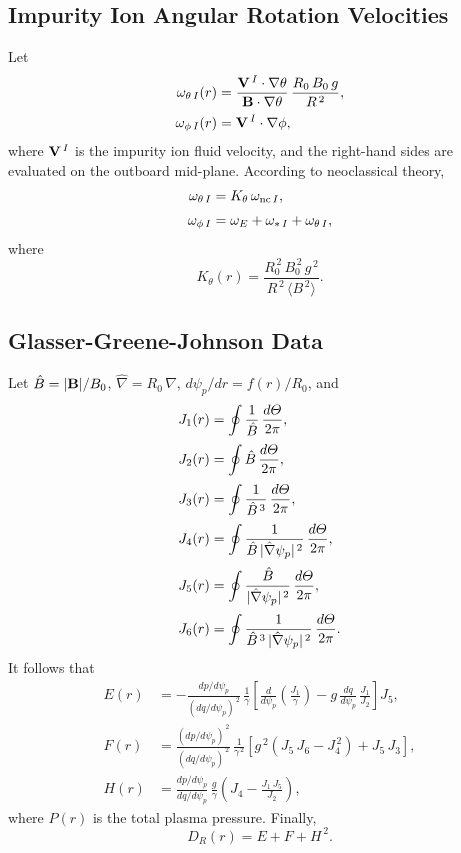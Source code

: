 \documentclass[notitlepage,12pt]{article}
\begin{document}
\subsection{Impurity Ion Angular Rotation Velocities}\label{srotation}
Let
\begin{align}
\omega_{\theta\,I}(r)&=\frac{{\bf V}^{\,I}\cdot\nabla\theta}{{\bf B}\cdot\nabla\theta}\,\frac{R_0\,B_0\,g}{R^{\,2}},\\[0.5ex]
\omega_{\phi\,I}(r) &= {\bf V}^{\,I}\cdot\nabla\phi,
\end{align}
where ${\bf V}^{\,I}$ is the impurity ion fluid velocity, and the right-hand sides are evaluated on the outboard mid-plane. According to neoclassical theory,
\begin{align}
\omega_{\theta\,I} &= K_\theta\,\omega_{{\rm nc}\,I},\\[0.5ex]
\omega_{\phi\,I} &= \omega_E+\omega_{\ast\,I} + \omega_{\theta\,I},
\end{align}
where
\begin{equation}
K_\theta(r) = \frac{R_0^{\,2}\,B_0^{\,2}\,g^{\,2}}{R^{\,2}\,\langle B^{\,2}\rangle}.
\end{equation}

\subsection{Glasser-Greene-Johnson Data}
Let $\hat{B}=|{\bf B}|/B_0$, $\hat{\nabla}= R_0\,\nabla$, $d\psi_p/dr = f(r)/R_0$, and 
\begin{align}
J_1(r) &= \oint\frac{1}{\hat{B}}\,\frac{d{\mit\Theta}}{2\pi},\\[0.5ex]
J_2(r) &= \oint \hat{B}\,\frac{d{\mit\Theta}}{2\pi},\\[0.5ex]
J_3(r) &= \oint\frac{1}{\hat{B}^{\,3}}\,\frac{d{\mit\Theta}}{2\pi},\\[0.5ex]
J_4(r) &= \oint\frac{1}{\hat{B}\,|\hat{\nabla}\psi_p|^{\,2}}\,\frac{d{\mit\Theta}}{2\pi},\\[0.5ex]
J_5(r) &= \oint\frac{\hat{B}}{|\hat{\nabla}\psi_p|^{\,2}}\,\frac{d{\mit\Theta}}{2\pi},\\[0.5ex]
J_6(r) &= \oint\frac{1}{\hat{B}^{\,3}\,|\hat{\nabla}\psi_p|^{\,2}}\,\frac{d{\mit\Theta}}{2\pi}.
\end{align}
It follows that
\begin{align}
E(r) &= - \frac{dp/d\psi_p}{(dq/d\psi_p)^{\,2}}\,\frac{1}{\gamma}\left[\frac{d}{d\psi_p}\!\left(\frac{J_1}{\gamma}\right) - g\,\frac{dq}{d\psi_p}\,\frac{J_1}{J_2}\right]J_5,\\[0.5ex]
F(r) &= \frac{(dp/d\psi_p)^{\,2}}{(dq/d\psi_p)^{\,2}}\,\frac{1}{\gamma^{\,2}}\left[g^{\,2}\left(J_5\,J_6- J_4^{\,2}\right)+ J_5\,J_3\right],
\\[0.5ex]
H(r)&= \frac{dp/d\psi_p}{dq/d\psi_p}\,\frac{g}{\gamma}\left(J_4 - \frac{J_1\,J_5}{J_2}\right),
\end{align}
where $P(r)$ is the total plasma pressure. 
Finally,
\begin{equation}
D_R(r)= E + F + H^{\,2}.
\end{equation}
\end{document}
